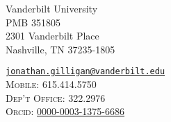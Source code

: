 \noindent
\parbox[t]{0.45\textwidth}{%
Vanderbilt University\\
PMB 351805\\
2301 Vanderbilt Place\\
Nashville, TN 37235-1805
}
\parbox[t]{0.5\textwidth}{\raggedleft
	{%
    \href{mailto:jonathan.gilligan@vanderbilt.edu}{\nolinkurl{jonathan.gilligan@vanderbilt.edu}}%
	}\\
    \textsc{Mobile:} 615.414.5750\\
    \textsc{Dep't Office:} 322.2976\\
    \textsc{Orcid:} \href{https://orcid.org/0000-0003-1375-6686}{0000-0003-1375-6686}\\
    \iffalse
    \textsc{ssrn id:} \href{https://papers.ssrn.com/sol3/cf_dev/AbsByAuth.cfm?per_id=954061}{954061}\\
    \fi
    \qquad{}
}
